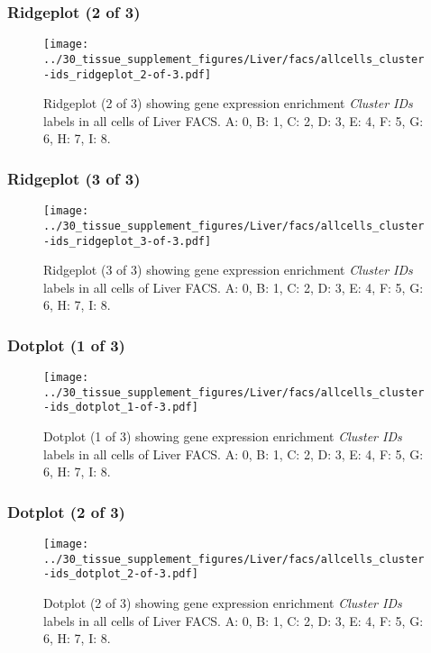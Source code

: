 \clearpage

\subsubsection{Ridgeplot (2 of 3)}
\begin{figure}[h]
\centering
\texttt{[image: ../30\_tissue\_supplement\_figures/Liver/facs/allcells\_cluster-ids\_ridgeplot\_2-of-3.pdf]}

\caption{ Ridgeplot (2 of 3)  showing gene expression enrichment \emph{Cluster IDs} labels in all cells of Liver FACS. A: 0, B: 1, C: 2, D: 3, E: 4, F: 5, G: 6, H: 7, I: 8.}
\end{figure}


\clearpage

\subsubsection{Ridgeplot (3 of 3)}
\begin{figure}[h]
\centering
\texttt{[image: ../30\_tissue\_supplement\_figures/Liver/facs/allcells\_cluster-ids\_ridgeplot\_3-of-3.pdf]}

\caption{ Ridgeplot (3 of 3)  showing gene expression enrichment \emph{Cluster IDs} labels in all cells of Liver FACS. A: 0, B: 1, C: 2, D: 3, E: 4, F: 5, G: 6, H: 7, I: 8.}
\end{figure}


\clearpage

\subsubsection{Dotplot (1 of 3)}
\begin{figure}[h]
\centering
\texttt{[image: ../30\_tissue\_supplement\_figures/Liver/facs/allcells\_cluster-ids\_dotplot\_1-of-3.pdf]}

\caption{ Dotplot (1 of 3)  showing gene expression enrichment \emph{Cluster IDs} labels in all cells of Liver FACS. A: 0, B: 1, C: 2, D: 3, E: 4, F: 5, G: 6, H: 7, I: 8.}
\end{figure}


\clearpage

\subsubsection{Dotplot (2 of 3)}
\begin{figure}[h]
\centering
\texttt{[image: ../30\_tissue\_supplement\_figures/Liver/facs/allcells\_cluster-ids\_dotplot\_2-of-3.pdf]}

\caption{ Dotplot (2 of 3)  showing gene expression enrichment \emph{Cluster IDs} labels in all cells of Liver FACS. A: 0, B: 1, C: 2, D: 3, E: 4, F: 5, G: 6, H: 7, I: 8.}
\end{figure}



